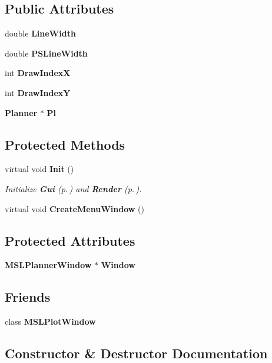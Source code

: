 \subsection*{Public Attributes}
\begin{CompactItemize}
\item 
double {\bf Line\-Width}
\item 
double {\bf PSLine\-Width}
\item 
int {\bf Draw\-Index\-X}
\item 
int {\bf Draw\-Index\-Y}
\item 
{\bf Planner} $\ast$ {\bf Pl}
\end{CompactItemize}
\subsection*{Protected Methods}
\begin{CompactItemize}
\item 
virtual void {\bf Init} ()
\begin{CompactList}\small\item\em Initialize {\bf Gui} {\rm (p.\,\pageref{classGui})} and {\bf Render} {\rm (p.\,\pageref{classRender})}.\item\end{CompactList}\item 
virtual void {\bf Create\-Menu\-Window} ()
\end{CompactItemize}
\subsection*{Protected Attributes}
\begin{CompactItemize}
\item 
{\bf MSLPlanner\-Window} $\ast$ {\bf Window}
\end{CompactItemize}
\subsection*{Friends}
\begin{CompactItemize}
\item 
class {\bf MSLPlot\-Window}
\end{CompactItemize}


\subsection{Constructor \& Destructor Documentation}
